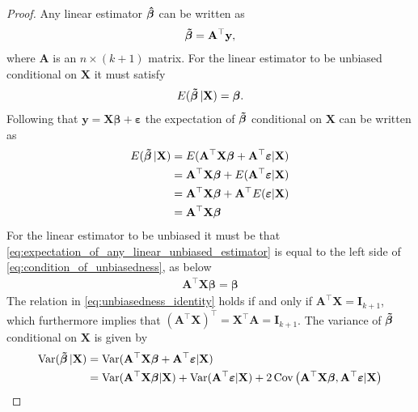 \begin{proof}
    Any linear estimator $\operatorname{\boldsymbol{\hat{\beta}}}$ can be written as
    \begin{align}\label{eq:any_linear_operator}
        \boldsymbol{\Tilde{\beta}} = \mathbf{A}^\top \mathbf{y},
    \end{align}
    where $\mathbf{A}$ is an $n \times (k + 1)$ matrix.
    For the linear estimator to be unbiased conditional on $\mathbf{X}$ it must satisfy
    \begin{align}\label{eq:condition_of_unbiasedness}
        E(\operatorname{\boldsymbol{\Tilde{\beta}}}|\mathbf{X}) = \boldsymbol{\beta}.
    \end{align}
    Following that $\mathbf{y} = \mathbf{X}\boldsymbol{\beta} + \boldsymbol{\varepsilon}$ the expectation of $\operatorname{\boldsymbol{\Tilde{\beta}}}$ conditional on $\mathbf{X}$ can be written as
    \begin{align}
       E(\operatorname{\boldsymbol{\Tilde{\beta}}}|\mathbf{X}) &= E( \mathbf{A}^\top\mathbf{X}\boldsymbol{\beta} + \mathbf{A}^\top\boldsymbol{\varepsilon}|\mathbf{X} )\nonumber \\
        &=  \mathbf{A}^\top\mathbf{X}\boldsymbol{\beta} + E( \mathbf{A}^\top\boldsymbol{\varepsilon}|\mathbf{X} )\nonumber \\
        &=\mathbf{A}^\top\mathbf{X}\boldsymbol{\beta} +  \mathbf{A}^\top E( \boldsymbol{\varepsilon}|\mathbf{X} )\nonumber \\
        &=\mathbf{A}^\top\mathbf{X}\boldsymbol{\beta}\label{eq:expectation_of_any_linear_unbiased_estimator}
    \end{align}
    For the linear estimator to be unbiased it must be that \eqref{eq:expectation_of_any_linear_unbiased_estimator} is equal to the left side of \eqref{eq:condition_of_unbiasedness}, as below
    \begin{align}\label{eq:unbiasedness_identity}
        \mathbf{A}^\top\mathbf{X}\boldsymbol{\beta} = \boldsymbol{\beta}
    \end{align}
    The relation in \eqref{eq:unbiasedness_identity} holds if and only if $\mathbf{A}^\top\mathbf{X} = \mathbf{I}_{k + 1}$, which furthermore implies that $(\mathbf{A}^\top\mathbf{X})^\top = \mathbf{X}^\top\mathbf{A} = \mathbf{I}_{k + 1}$.
    The variance of $\operatorname{\boldsymbol{\Tilde{\beta}}}$ conditional on $\mathbf{X}$ is given by
    \begin{align}
        \var(\betatilde|\mathbf{X}) &= \var(\mathbf{A}^\top\mathbf{X}\boldsymbol{\beta} + \mathbf{A}^\top\boldsymbol{\varepsilon}|\mathbf{X}) \nonumber\\
        &= \var(\mathbf{A}^\top\mathbf{X}\boldsymbol{\beta}|\mathbf{X}) + \var(\mathbf{A}^\top\boldsymbol{\varepsilon}|\mathbf{X}) + 2 \cov\left(\mathbf{A}^\top\mathbf{X}\boldsymbol{\beta},\mathbf{A}^\top\boldsymbol{\varepsilon}|\mathbf{X}\right) \nonumber\\

\end{align}
\end{proof}
